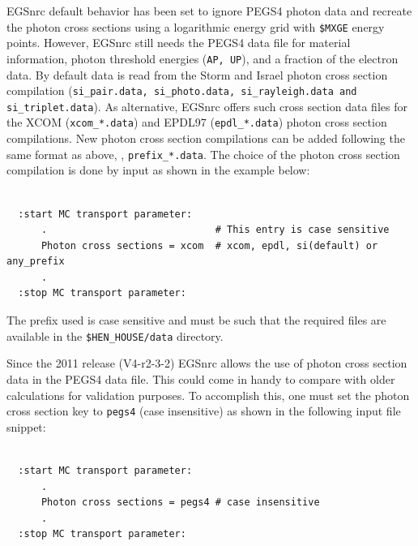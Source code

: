 EGSnrc default behavior has been set to ignore PEGS4 photon 
data and recreate the photon cross sections using a logarithmic energy 
grid with {\tt \$MXGE} energy points. However, EGSnrc still needs the 
PEGS4 data file for material information, photon threshold energies 
({\tt AP, UP}), and a fraction of the electron data.
By default data is read from the 
Storm and Israel\cite{SI70} photon cross section compilation 
({\tt si\_pair.data, si\_photo.data, si\_rayleigh.data and 
si\_triplet.data}).
As alternative, EGSnrc offers such cross section data files 
for the XCOM\cite{HS95} ({\tt xcom\_*.data}) and EPDL97\cite{Cu89} 
({\tt epdl\_*.data}) photon cross section compilations. 
New photon cross section compilations can be added following the 
same format as above, \ie, {\tt prefix\_*.data}.
The choice of the photon cross section 
compilation is done by input as shown in the example below:
\begin{verbatim}

  :start MC transport parameter:
      .                             # This entry is case sensitive
      Photon cross sections = xcom  # xcom, epdl, si(default) or any_prefix
      .
  :stop MC transport parameter:

\end{verbatim}
The prefix used is case sensitive and must be such that the required files
are available in the {\tt \$HEN\_HOUSE/data} directory.

Since the 2011 release (V4-r2-3-2) EGSnrc allows the 
use of photon cross section data in the PEGS4 data file. This could
come in handy to compare with older calculations for validation
purposes. To accomplish this, one must set the photon cross section key to
{\tt pegs4} (case insensitive) as shown in the following input file snippet:
\begin{verbatim}

  :start MC transport parameter:
      .
      Photon cross sections = pegs4 # case insensitive
      .
  :stop MC transport parameter:

\end{verbatim}
